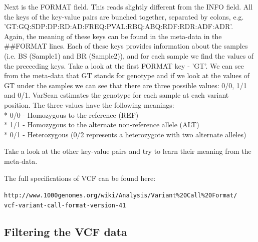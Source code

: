 \documentclass[12pt,a4paper]{article}
\begin{document}
Next is the FORMAT field. This reads slightly different from the INFO
field. All the keys of the key-value pairs are bunched together,
separated by colons,
e.g. 'GT:GQ:SDP:DP:RD:AD:FREQ:PVAL:RBQ:ABQ:RDF:RDR:ADF:ADR'. \\Again,
the meaning of these keys can be found in the meta-data in the
\#\#FORMAT lines. Each of these keys provides information about the
samples (i.e. BS (Sample1) and BR (Sample2)), and for each sample we
find the values of the preceeding keys. Take a look at the first
FORMAT key - 'GT'. We can see from the meta-data that GT stands for
genotype and if we look at the values of GT under the samples we can
see that there are three possible values: 0/0, 1/1 and 0/1. VarScan
estimates the genotype for each sample at each variant position. The
three values have the following meanings: 
\\* 0/0 - Homozygous to the reference (REF) 
\\* 1/1 - Homozygous to the alternate non-reference allele (ALT) 
\\* 0/1 - Heterozygous (0/2 represents a heterozygote with two
alternate alleles)

Take a look at the other key-value pairs and try to learn their
meaning from the meta-data.

The full specifications of VCF can be found here:   

\texttt{http://www.1000genomes.org/wiki/Analysis/Variant\%20Call\%20Format/\\vcf-variant-call-format-version-41}

\subsection{Filtering the VCF data}
\end{document}
